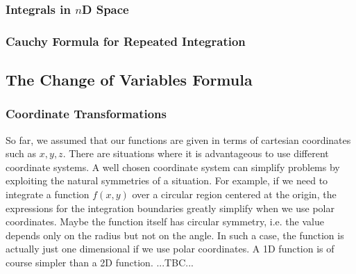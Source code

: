 

\subsubsection{Integrals in $n$D Space}



\subsubsection{Cauchy Formula for Repeated Integration} 









\subsection{The Change of Variables Formula}

\subsubsection{Coordinate Transformations}
So far, we assumed that our functions are given in terms of cartesian coordinates such as $x,y,z$. There are situations where it is advantageous to use different coordinate systems. A well chosen coordinate system can simplify problems by exploiting the natural symmetries of a situation. For example, if we need to integrate a function $f(x,y)$ over a circular region centered at the origin, the expressions for the integration boundaries greatly simplify when we use polar coordinates. Maybe the function itself has circular symmetry, i.e. the value depends only on the radius but not on the angle. In such a case, the function is actually just one dimensional if we use polar coordinates. A 1D function is of course simpler than a 2D function. 
...TBC...

